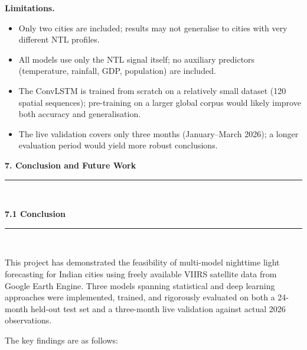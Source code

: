 \documentclass[12pt,a4paper]{report}
\begin{document}
\textbf{Limitations.}
\begin{itemize}[leftmargin=1.5cm]
    \item Only two cities are included; results may not generalise to cities with very different NTL profiles.
    \item All models use only the NTL signal itself; no auxiliary predictors (temperature, rainfall, GDP, population) are included.
    \item The ConvLSTM is trained from scratch on a relatively small dataset (120 spatial sequences); pre-training on a larger global corpus would likely improve both accuracy and generalisation.
    \item The live validation covers only three months (January--March 2026); a longer evaluation period would yield more robust conclusions.
\end{itemize}

\newpage
\thispagestyle{plain}
\begin{center}
    \hypertarget{sec:ch7}{}%
    {\Large \textbf{7. Conclusion and Future Work}}\\[0.3cm]
    \noindent\rule{\linewidth}{0.6pt}\\[0.8cm]
\end{center}
\setlength{\parindent}{1cm}
\setlength{\parskip}{6pt}
\justifying

\vspace{0.5cm}
\begin{center}
    \hypertarget{sec:s71}{}%
    {\large \textbf{7.1 Conclusion}}\\[0.3cm]
    \noindent\rule{\linewidth}{0.4pt}\\[0.5cm]
\end{center}

This project has demonstrated the feasibility of multi-model nighttime light forecasting for Indian cities using freely available VIIRS satellite data from Google Earth Engine. Three models spanning statistical and deep learning approaches were implemented, trained, and rigorously evaluated on both a 24-month held-out test set and a three-month live validation against actual 2026 observations.

The key findings are as follows:
\end{document}
